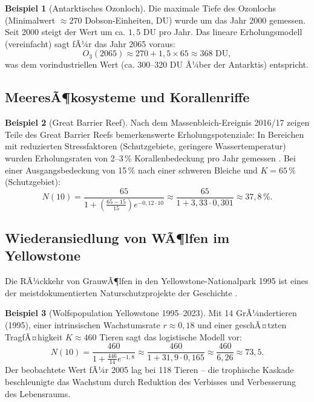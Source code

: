 ﻿\documentclass[a4paper,12pt]{article}
\theoremstyle{definition}
\newtheorem{beispiel}{Beispiel}
\begin{document}
\begin{beispiel}[Antarktisches Ozonloch]
	Die maximale Tiefe des Ozonlochs (Minimalwert $\approx 270$ Dobson-Einheiten, DU) wurde um das Jahr 2000 gemessen. Seit 2000 steigt der Wert um ca. $1{,}5$ DU pro Jahr. Das lineare Erholungsmodell (vereinfacht) sagt fÃ¼r das Jahr 2065 voraus:
	\[
	O_3(2065) \approx 270 + 1{,}5 \times 65 \approx 368\text{ DU},
	\]
	was dem vorindustriellen Wert (ca. 300--320 DU Ã¼ber der Antarktis) entspricht.
\end{beispiel}

\subsection{MeeresÃ¶kosysteme und Korallenriffe}

\begin{beispiel}[Great Barrier Reef]
	Nach dem Massenbleich-Ereignis 2016/17 zeigen Teile des Great Barrier Reefs bemerkenswerte Erholungspotenziale: In Bereichen mit reduzierten Stressfaktoren (Schutzgebiete, geringere Wassertemperatur) wurden Erholungsraten von 2--3\,\% Korallenbedeckung pro Jahr gemessen \cite{hughes2018global}. Bei einer Ausgangsbedeckung von 15\,\% nach einer schweren Bleiche und $K = 65\,\%$ (Schutzgebiet):
	\[
	N(10) = \frac{65}{1 + \left(\frac{65-15}{15}\right)e^{-0{,}12 \cdot 10}} \approx \frac{65}{1 + 3{,}33 \cdot 0{,}301} \approx 37{,}8\,\%.
	\]
\end{beispiel}

\subsection{Wiederansiedlung von WÃ¶lfen im Yellowstone}

Die RÃ¼ckkehr von GrauwÃ¶lfen in den Yellowstone-Nationalpark 1995 ist eines der meistdokumentierten Naturschutzprojekte der Geschichte \cite{ripple2014wolves}.

\begin{beispiel}[Wolfspopulation Yellowstone 1995--2023]
	Mit 14 GrÃ¼ndertieren (1995), einer intrinsischen Wachstumsrate $r \approx 0{,}18$ und einer geschÃ¤tzten TragfÃ¤higkeit $K \approx 460$ Tieren sagt das logistische Modell vor:
	\[
	N(10) = \frac{460}{1 + \frac{446}{14} e^{-1{,}8}} \approx \frac{460}{1 + 31{,}9 \cdot 0{,}165} \approx \frac{460}{6{,}26} \approx 73{,}5.
	\]
	Der beobachtete Wert fÃ¼r 2005 lag bei 118 Tieren -- die trophische Kaskade beschleunigte das Wachstum durch Reduktion des Verbisses und Verbesserung des Lebensraums.
\end{beispiel}
\end{document}
